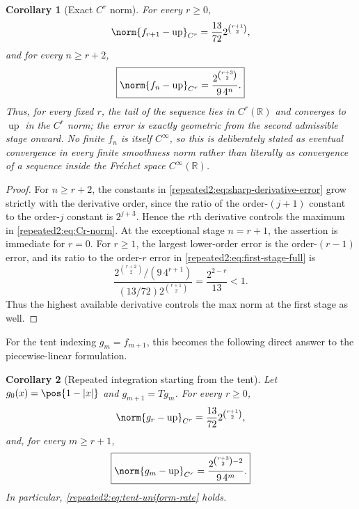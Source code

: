\documentclass[11pt,oneside]{article}
\newtheorem{corollary}[corollary]{Corollary}
\theoremstyle{definition}
\theoremstyle{remark}
\newcommand{\R}{\mathbb R}
\newcommand{\Up}{\operatorname{up}}
\begin{document}
\begin{corollary}[Exact $C^r$ norm]
\label{repeated2:cor:exact-Cr-rate}
For every $r\ge0$,
\begin{equation}
 \norm{f_{r+1}-\Up}_{C^r}
 =\frac{13}{72}2^{\binom{r+1}{2}},
 \label{repeated2:eq:first-Cr-error}
\end{equation}
and for every $n\ge r+2$,
\begin{equation}
 \boxed{\displaystyle
 \norm{f_n-\Up}_{C^r}
 =\frac{2^{\binom{r+3}{2}}}{9\,4^n}.}
 \label{repeated2:eq:exact-Cr-rate}
\end{equation}
Thus, for every fixed $r$, the tail of the sequence lies in $C^r(\R)$ and converges to
$\Up$ in the $C^r$ norm; the error is exactly geometric from the second admissible stage
onward.  No finite $f_n$ is itself $C^\infty$, so this is deliberately stated as eventual
convergence in every finite smoothness norm rather than literally as convergence of a
sequence inside the Fr\'echet space $C^\infty(\R)$.
\end{corollary}

\begin{proof}
For $n\ge r+2$, the constants in \eqref{repeated2:eq:sharp-derivative-error} grow strictly with the
derivative order, since the ratio of the order-$(j+1)$ constant to the order-$j$ constant
is $2^{j+3}$.  Hence the $r$th derivative controls the maximum in
\eqref{repeated2:eq:Cr-norm}.  At the exceptional stage $n=r+1$, the assertion is immediate for
$r=0$.  For $r\ge1$, the largest lower-order error is the order-$(r-1)$ error, and its
ratio to the order-$r$ error in \eqref{repeated2:eq:first-stage-full} is
\[
 \frac{2^{\binom{r+2}{2}}/(9\,4^{r+1})}
 {(13/72)2^{\binom{r+1}{2}}}
 =\frac{2^{2-r}}{13}<1.
\]
Thus the highest available derivative controls the max norm at the first stage as well.
\end{proof}

For the tent indexing $g_m=f_{m+1}$, this becomes the following direct answer to the
piecewise-linear formulation.

\begin{corollary}[Repeated integration starting from the tent]
\label{repeated2:cor:tent-indexed-rate}
Let $g_0(x)=\pos{1-|x|}$ and $g_{m+1}=Tg_m$.  For every $r\ge0$,
\begin{equation}
 \norm{g_r-\Up}_{C^r}
 =\frac{13}{72}2^{\binom{r+1}{2}},
 \label{repeated2:eq:tent-first-Cr}
\end{equation}
and, for every $m\ge r+1$,
\begin{equation}
 \boxed{\displaystyle
 \norm{g_m-\Up}_{C^r}
 =\frac{2^{\binom{r+3}{2}-2}}{9\,4^m}.}
 \label{repeated2:eq:tent-Cr-rate}
\end{equation}
In particular, \eqref{repeated2:eq:tent-uniform-rate} holds.
\end{corollary}
\end{document}
